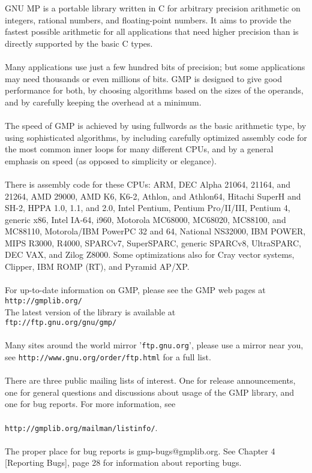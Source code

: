 \documentclass[pdftex,10pt]{article}
\begin{document}
GNU MP is a portable library written in C for arbitrary precision arithmetic on
integers, rational numbers, and floating-point numbers. It aims to provide the
fastest possible arithmetic for all applications that need higher precision
than is directly supported by the basic C types.\\
\\
Many applications use just a few hundred bits of precision; but some
applications may need thousands or even millions of bits. GMP is designed to
give good performance for both, by choosing algorithms based on the sizes of
the operands, and by carefully keeping the overhead at a minimum.\\
\\
The speed of GMP is achieved by using fullwords as the basic arithmetic type,
by using sophisticated algorithms, by including carefully optimized assembly
code for the most common inner loops for many different CPUs, and by a general
emphasis on speed (as opposed to simplicity or elegance).\\
\\
There is assembly code for these CPUs: ARM, DEC Alpha 21064, 21164, and 21264,
AMD 29000, AMD K6, K6-2, Athlon, and Athlon64, Hitachi SuperH and SH-2, HPPA
1.0, 1.1, and 2.0, Intel Pentium, Pentium Pro/II/III, Pentium 4, generic x86,
Intel IA-64, i960, Motorola MC68000, MC68020, MC88100, and MC88110,
Motorola/IBM PowerPC 32 and 64, National NS32000, IBM POWER, MIPS R3000, R4000,
SPARCv7, SuperSPARC, generic SPARCv8, UltraSPARC, DEC VAX, and Zilog Z8000.
Some optimizations also for Cray vector systems, Clipper, IBM ROMP (RT), and
Pyramid AP/XP.\\
\\
For up-to-date information on GMP, please see the GMP web pages at\\
\setlength{\parindent}{0.25in}
\texttt{http://gmplib.org/}
\setlength{\parindent}{0in}
\\

The latest version of the library is available at\\
\setlength{\parindent}{0.25in}
\texttt{ftp://ftp.gnu.org/gnu/gmp/}\\
\setlength{\parindent}{0in}
\\

Many sites around the world mirror '\texttt{ftp.gnu.org}', please use a mirror
near you, see \texttt{http://www.gnu.org/order/ftp.html} for a full list.\\
\\
There are three public mailing lists of interest. One for release
announcements, one for general questions and discussions about usage of the GMP
library, and one for bug reports. For more information, see\\
\\
\texttt{http://gmplib.org/mailman/listinfo/}.\\
\\
The proper place for bug reports is gmp-bugs@gmplib.org. See Chapter 4
[Reporting Bugs], page 28 for information about reporting bugs.
\end{document}
